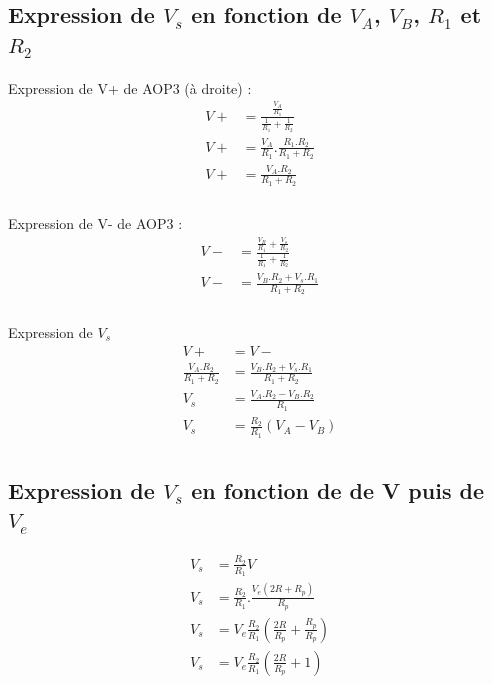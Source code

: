 \documentclass{article}
\begin{document}
\subsection{Expression de $V_s$ en fonction de $V_A$, $V_B$, $R_1$ et $R_2$}

\paragraph{}Expression de V+ de AOP3 (à droite) :
\begin{align*}
    V+ &= \frac{ \frac{V_A}{R_1} } { \frac{1}{R_1} + \frac{1}{R_2} }\\
    V+ &= \frac{V_A}{R_1} . \frac{R_1.R_2}{R_1 + R_2}\\
    V+ &= \frac{V_A.R_2}{R_1 + R_2}\\
\end{align*}

\paragraph{}Expression de V- de AOP3 :
\begin{align*}
    V- &= \frac{ \frac{V_B}{R_1} + \frac{V_s}{R_2} } { \frac{1}{R_1} + \frac{1}{R_2} }\\
    V- &= \frac{ V_B.R_2 + V_s.R_1 } { R_1 + R_2 }\\
\end{align*}

\paragraph{}Expression de $V_s$
\begin{align*}
    V+ &= V-\\
    \frac{V_A.R_2}{R_1 + R_2} &= \frac{ V_B.R_2 + V_s.R_1 } { R_1 + R_2 } \\
    V_s &= \frac{V_A.R_2 - V_B.R_2}{R_1} \\
    V_s &= \frac{R_2}{R_1}(V_A - V_B) \\
\end{align*}

\subsection{Expression de $V_s$ en fonction de de V puis de $V_e$}
\begin{align*}
    V_s &= \frac{R_2}{R_1}V \\
    V_s &= \frac{R_2}{R_1}.\frac{V_e(2R + R_p)}{R_p} \\
    V_s &= V_e\frac{R_2}{R_1}\left(\frac{2R}{R_p} + \frac{R_p}{R_p}\right) \\
    V_s &= V_e\frac{R_2}{R_1}\left(\frac{2R}{R_p} + 1\right) \\
\end{align*}
\end{document}
